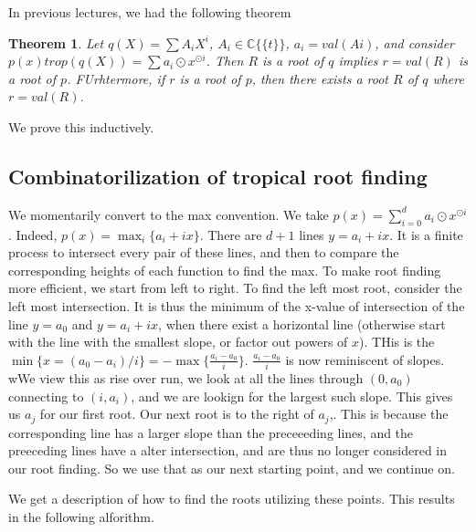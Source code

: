 \documentclass[11pt]{article}
\newtheorem{prototheorem}{Theorem}[section]
\newenvironment{theorem}
   {\begin{prototheorem}}
   {\end{prototheorem}}
\theoremstyle{definition}
\def\CC{{\mathbb C}}
\begin{document}
In previous lectures, we had the following theorem

\begin{theorem}
    Let $q(X) = \sum A_iX^i$, $A_i \in \CC \{\{t\}\}$, $a_i = val(Ai)$, and consider $p(x)  trop (q(X)) = \sum a_i \odot x^{\odot i}$. Then $R$ is a root of $q$ implies $r=val(R)$ is a root of $p$. FUrhtermore, if $r$ is a root of $p$, then there exists a root $R$ of $q$ where $r = val(R)$.
\end{theorem}
We prove this inductively. 


\subsection{Combinatorilization of tropical root finding}

We momentarily convert to the max convention. We take $p(x) = \sum\limits_{i=0}^d a_i \odot x^{\odot i}$. Indeed, $p(x) = \max_i \{a_i + ix\}$. There are $d+1$ lines $y= a_i + ix$. It is a finite process to intersect every pair of these lines, and then to compare the corresponding heights of each function to find the max. To make root finding more efficient, we start from left to right. To find the left most root, consider the left most intersection. It is thus the minimum of the x-value of intersection of the line $y=a_0$ and $y=a_i + ix$, when there exist a horizontal line (otherwise start with the line with the smallest slope, or factor out powers of $x$). THis is the $\min\{ x= (a_0-a_i)/i\}=-\max \{\frac{a_i-a_0}{i}\}$. $\frac{a_i-a_0}{i}$ is now reminiscent of slopes. wWe view this as rise over run, we look at all the lines through $(0,a_0)$ connecting to $(i,a_i)$, and we are lookign for the largest such slope. This gives us $a_j$ for our first root. Our next root is to the right of $a_j$,. This is because the corresponding line has a larger slope than the preceeeding lines, and the preeceding lines have a alter intersection, and are thus no longer considered in our root finding. So we use that as our next starting point, and we continue on.

We get a description of how to find the roots utilizing these points. This results in the following alforithm.
\end{document}
